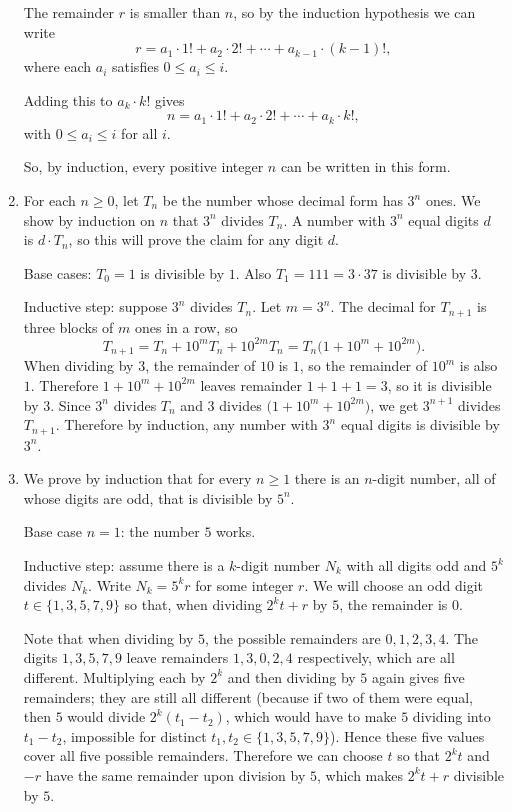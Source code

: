 \documentclass[12pt]{article}
\begin{document}
\begin{enumerate}
The remainder $r$ is smaller than $n$, so by the induction hypothesis we can write
\[
r = a_1\cdot 1! + a_2\cdot 2! + \cdots + a_{k-1}\cdot (k-1)!,
\]
where each $a_i$ satisfies $0 \le a_i \le i$.  

Adding this to $a_k \cdot k!$ gives
\[
n = a_1\cdot 1! + a_2\cdot 2! + \cdots + a_k\cdot k!,
\]
with $0 \le a_i \le i$ for all $i$.  

So, by induction, every positive integer $n$ can be written in this form.

\item For each $n\ge 0$, let $T_n$ be the number whose decimal form has $3^n$ ones.
We show by induction on $n$ that $3^n$ divides $T_n$.
A number with $3^n$ equal digits $d$ is $d\cdot T_n$, so this will prove the claim for any digit $d$.

Base cases: $T_0=1$ is divisible by $1$. Also $T_1=111=3\cdot 37$ is divisible by $3$.

Inductive step: suppose $3^n$ divides $T_n$.
Let $m=3^n$. The decimal for $T_{n+1}$ is three blocks of $m$ ones in a row, so
\[
T_{n+1}=T_n+10^{m}T_n+10^{2m}T_n=T_n\bigl(1+10^{m}+10^{2m}\bigr).
\]
When dividing by $3$, the remainder of $10$ is $1$, so the remainder of $10^{m}$ is also $1$.
Therefore $1+10^{m}+10^{2m}$ leaves remainder $1+1+1=3$, so it is divisible by $3$.
Since $3^n$ divides $T_n$ and $3$ divides $\bigl(1+10^{m}+10^{2m}\bigr)$, we get
$3^{n+1}$ divides $T_{n+1}$. 
Therefore by induction, any number with $3^n$ equal digits is divisible by $3^n$.

\item We prove by induction that for every $n\ge 1$ there is an $n$-digit number,
all of whose digits are odd, that is divisible by $5^n$.

Base case $n=1$: the number $5$ works.

Inductive step: assume there is a $k$-digit number $N_k$ with all digits odd and $5^k$ divides $N_k$.
Write $N_k=5^k r$ for some integer $r$. We will choose an odd digit $t\in\{1,3,5,7,9\}$
so that, when dividing $2^k t + r$ by $5$, the remainder is $0$.

Note that when dividing by $5$, the possible remainders are $0,1,2,3,4$.
The digits $1,3,5,7,9$ leave remainders $1,3,0,2,4$ respectively, which are all different.
Multiplying each by $2^k$ and then dividing by $5$ again gives five remainders; they are still all different
(because if two of them were equal, then $5$ would divide $2^k(t_1-t_2)$, which would have to make $5$ dividing into $t_1-t_2$,
impossible for distinct $t_1,t_2\in\{1,3,5,7,9\}$). Hence these five values cover all five possible remainders.
Therefore we can choose $t$ so that $2^k t$ and $-r$ have the same remainder upon division by $5$,
which makes $2^k t + r$ divisible by $5$.


\end{enumerate}
\end{document}
